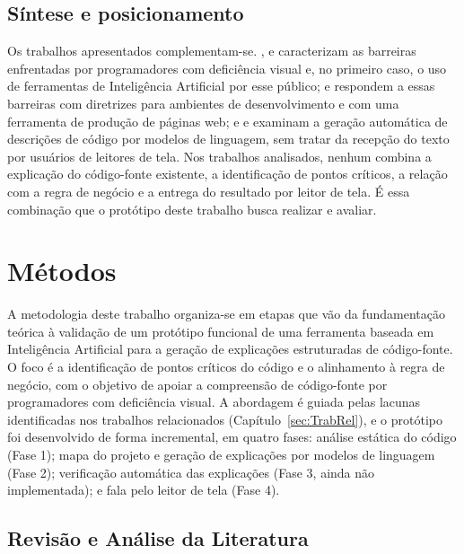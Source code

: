 \documentclass[
    12pt,                   %
    openright,              %
    oneside,                %
    a4paper,                %
    sumario=tradicional,    %
    english,                %
    brazil,                 %
    ]{abntex2}
\begin{document}
\section{Síntese e posicionamento}

Os trabalhos apresentados complementam-se. \textcite{latinoware34224}, \textcite{latinoware20457} e \textcite{acad54431201} caracterizam as barreiras enfrentadas por programadores com deficiência visual e, no primeiro caso, o uso de ferramentas de Inteligência Artificial por esse público; \textcite{latinoware37693} e \textcite{latinoware40920} respondem a essas barreiras com diretrizes para ambientes de desenvolvimento e com uma ferramenta de produção de páginas web; e \textcite{sun2023chatgptsum} e \textcite{hou2024llmse} examinam a geração automática de descrições de código por modelos de linguagem, sem tratar da recepção do texto por usuários de leitores de tela. Nos trabalhos analisados, nenhum combina a explicação do código-fonte existente, a identificação de pontos críticos, a relação com a regra de negócio e a entrega do resultado por leitor de tela. É essa combinação que o protótipo deste trabalho busca realizar e avaliar.



\chapter{Métodos}\label{sec:metodos}

A metodologia deste trabalho organiza-se em etapas que vão da fundamentação teórica à validação de um protótipo funcional de uma ferramenta baseada em Inteligência Artificial para a geração de explicações estruturadas de código-fonte. O foco é a identificação de pontos críticos do código e o alinhamento à regra de negócio, com o objetivo de apoiar a compreensão de código-fonte por programadores com deficiência visual. A abordagem é guiada pelas lacunas identificadas nos trabalhos relacionados (Capítulo~\ref{sec:TrabRel}), e o protótipo foi desenvolvido de forma incremental, em quatro fases: análise estática do código (Fase 1); mapa do projeto e geração de explicações por modelos de linguagem (Fase 2); verificação automática das explicações (Fase 3, ainda não implementada); e fala pelo leitor de tela (Fase 4).

\section{Revisão e Análise da Literatura}
\end{document}
